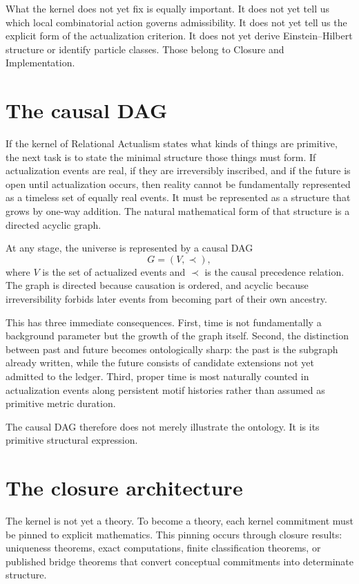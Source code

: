 \documentclass[11pt]{article}
\begin{document}
What the kernel does not yet fix is equally important. It does not yet tell us which local combinatorial action governs admissibility. It does not yet tell us the explicit form of the actualization criterion. It does not yet derive Einstein--Hilbert structure or identify particle classes. Those belong to Closure and Implementation.

\section{The causal DAG}\label{sec:dag}
If the kernel of Relational Actualism states what kinds of things are primitive, the next task is to state the minimal structure those things must form. If actualization events are real, if they are irreversibly inscribed, and if the future is open until actualization occurs, then reality cannot be fundamentally represented as a timeless set of equally real events. It must be represented as a structure that grows by one-way addition. The natural mathematical form of that structure is a directed acyclic graph.

At any stage, the universe is represented by a causal DAG
\[
G=(V,\prec),
\]
where $V$ is the set of actualized events and $\prec$ is the causal precedence relation. The graph is directed because causation is ordered, and acyclic because irreversibility forbids later events from becoming part of their own ancestry.

This has three immediate consequences. First, time is not fundamentally a background parameter but the growth of the graph itself. Second, the distinction between past and future becomes ontologically sharp: the past is the subgraph already written, while the future consists of candidate extensions not yet admitted to the ledger. Third, proper time is most naturally counted in actualization events along persistent motif histories rather than assumed as primitive metric duration.

The causal DAG therefore does not merely illustrate the ontology. It is its primitive structural expression.

\section{The closure architecture}\label{sec:closures}
The kernel is not yet a theory. To become a theory, each kernel commitment must be pinned to explicit mathematics. This pinning occurs through closure results: uniqueness theorems, exact computations, finite classification theorems, or published bridge theorems that convert conceptual commitments into determinate structure.
\end{document}
